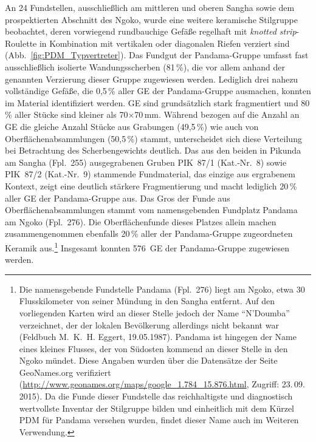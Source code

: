 An 24 Fundstellen, ausschließlich am mittleren und oberen \mbox{Sangha} sowie dem prospektierten Abschnitt des \mbox{Ngoko}, wurde eine weitere keramische Stilgruppe beobachtet, deren vorwiegend rundbauchige Gefäße regelhaft mit \textit{knotted strip}-Roulette in Kombination mit vertikalen oder diagonalen Riefen verziert sind (Abb.~\ref{fig:PDM_Typvertreter}). Das Fundgut der Pandama-Gruppe umfasst fast ausschließlich isolierte Wandungsscherben (81\,\%), die vor allem anhand der genannten Verzierung dieser Gruppe zugewiesen werden. Lediglich drei nahezu vollständige Gefäße, die 0,5\,\% aller GE der Pandama-Gruppe ausmachen, konnten im Material identifiziert werden. GE sind grundsätzlich stark fragmentiert und 80\,\% aller Stücke sind kleiner als 70$\times$70\,mm. Während bezogen auf die Anzahl an GE die gleiche Anzahl Stücke aus Grabungen (49,5\,\%) wie auch von Oberflächenabsammlungen (50,5\,\%) stammt, unterscheidet sich diese Verteilung bei Betrachtung des Scherbengewichts deutlich. Das aus den beiden in Pikunda am \mbox{Sangha} (Fpl.~255) ausgegrabenen Gruben PIK~87/1 (Kat.-Nr.~8) sowie PIK~87/2 (Kat.-Nr.~9) stammende Fundmaterial, das einzige aus ergrabenem Kontext, zeigt eine deutlich stärkere Fragmentierung und macht lediglich 20\,\% aller GE der Pandama-Gruppe aus. Das Gros der Funde aus Oberflächenabsammlungen stammt vom namensgebenden Fundplatz Pandama am \mbox{Ngoko} (Fpl.~276). Die Oberflächenfunde dieses Platzes allein machen zusammengenommen ebenfalls 20\,\% aller der Pandama-Gruppe zugeordneten Keramik aus.\footnote{Die namensgebende Fundstelle Pandama (Fpl.~276) liegt am \mbox{Ngoko}, etwa 30 Flusskilometer von seiner Mündung in den \mbox{Sangha} entfernt. Auf den vorliegenden Karten wird an dieser Stelle jedoch der Name \enquote{N’Doumba} verzeichnet, der der lokalen Bevölkerung allerdings nicht bekannt war (Feldbuch M.~K.~H. Eggert, 19.05.1987). Pandama ist hingegen der Name eines kleines Flusses, der von Südosten kommend an dieser Stelle in den \mbox{Ngoko} mündet. Diese Angaben wurden über die Datensätze der Seite GeoNames.org verifiziert (\url{http://www.geonames.org/maps/google_1.784_15.876.html}, Zugriff: 23.\,09.\,2015). Da die Funde dieser Fundstelle das reichhaltigste und diagnostisch wertvollste Inventar der Stilgruppe bilden und einheitlich mit dem Kürzel PDM für Pandama versehen wurden, findet dieser Name auch im Weiteren Verwendung.} Insgesamt konnten 576~GE der Pandama-Gruppe zugewiesen werden. 


